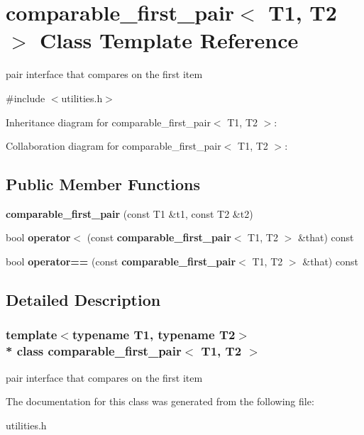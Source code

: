 \section{comparable\+\_\+first\+\_\+pair$<$ T1, T2 $>$ Class Template Reference}
\label{classcomparable__first__pair}


pair interface that compares on the first item  




{\ttfamily \#include $<$utilities.\+h$>$}



Inheritance diagram for comparable\+\_\+first\+\_\+pair$<$ T1, T2 $>$\+:


Collaboration diagram for comparable\+\_\+first\+\_\+pair$<$ T1, T2 $>$\+:
\subsection*{Public Member Functions}
\begin{DoxyCompactItemize}
\item 
{\bfseries comparable\+\_\+first\+\_\+pair} (const T1 \&t1, const T2 \&t2)
\item 
bool {\bfseries operator$<$} (const {\bf comparable\+\_\+first\+\_\+pair}$<$ T1, T2 $>$ \&that) const 
\item 
bool {\bfseries operator==} (const {\bf comparable\+\_\+first\+\_\+pair}$<$ T1, T2 $>$ \&that) const 
\end{DoxyCompactItemize}


\subsection{Detailed Description}
\subsubsection*{template$<$typename T1, typename T2$>$\\*
class comparable\+\_\+first\+\_\+pair$<$ T1, T2 $>$}

pair interface that compares on the first item 

The documentation for this class was generated from the following file\+:\begin{DoxyCompactItemize}
\item 
utilities.\+h\end{DoxyCompactItemize}
